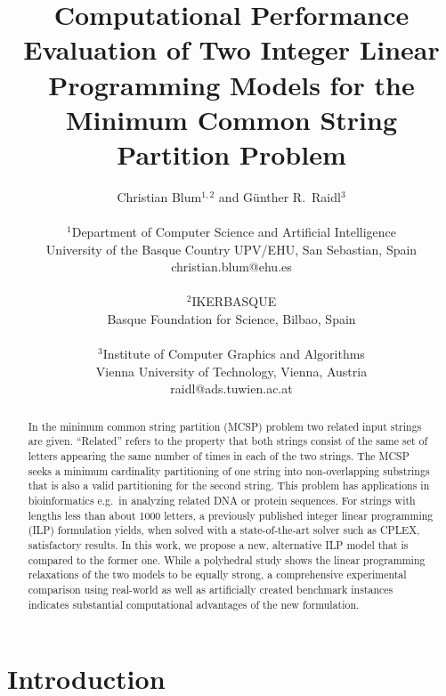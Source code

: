 \documentclass[11pt,a4paper]{article}
\begin{document}
\title{Computational Performance Evaluation of Two Integer Linear Programming Models for the Minimum Common String Partition Problem}

\author{Christian Blum$^{1,2}$ and G{\"u}nther R.~Raidl$^{3}$  \\
~\\
$^1$Department of Computer Science and Artificial Intelligence\\ 
University of the Basque Country UPV/EHU, San Sebastian, Spain \\
{\sf christian.blum@ehu.es}\\
~\\
$^2$IKERBASQUE\\
Basque Foundation for Science, Bilbao, Spain\\
~\\
$^3$Institute of Computer Graphics and Algorithms\\
Vienna University of Technology, Vienna, Austria \\
{\sf raidl@ads.tuwien.ac.at}}

\date{}

\maketitle

\begin{abstract}
In the minimum common string partition (MCSP) problem two related input
strings are given. ``Related'' refers to the property that both strings
consist of the same set of letters appearing the same number
of times in each of the two strings. The MCSP seeks a minimum
cardinality partitioning of one string into non-overlapping substrings
that is also a valid partitioning for the second string. This problem
has applications in bioinformatics e.g.\ in analyzing related DNA or
protein sequences.
For strings with lengths less than about 1000 letters, a previously
published integer linear programming (ILP) formulation yields, 
when solved with a state-of-the-art solver such as CPLEX,  satisfactory results. 
In this work, we propose a new, alternative ILP model that is compared 
to the former one. While a polyhedral study shows the linear programming
relaxations of the two models to be equally strong, a comprehensive
experimental comparison using real-world as well as artificially
created benchmark instances indicates substantial computational advantages
of the new formulation.
\end{abstract}

\section{Introduction}
\label{intro}
\end{document}
